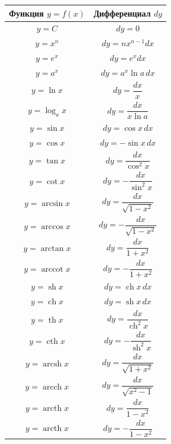 \documentclass[12pt]{article}
\begin{document}
\renewcommand{\arraystretch}{3}
\setlength{\tabcolsep}{70pt}
\begin{longtable}{|c|c|}
\hline
Функция $y = f(x)$ & Дифференциал $dy$ \\
\hline
$\displaystyle y = C$ & $\displaystyle dy = 0$ \\
\hline
$\displaystyle y = x^n$ & $\displaystyle dy = nx^{n-1}dx$ \\
\hline
$\displaystyle y = e^x$ & $\displaystyle dy = e^xdx$ \\
\hline
$\displaystyle y = a^x$ & $\displaystyle dy = a^x \ln{a} \, dx$ \\
\hline
$\displaystyle y = \ln{x}$ & $\displaystyle dy = \dfrac{dx}{x}$ \\
\hline
$\displaystyle y = \log_a{x}$ & $\displaystyle dy = \dfrac{dx}{x \ln{a}}$ \\
\hline
$\displaystyle y = \sin{x}$ & $\displaystyle dy = \cos{x} \, dx$ \\
\hline
$\displaystyle y = \cos{x}$ & $\displaystyle dy = - \sin{x} \, dx$ \\
\hline
$\displaystyle y = \tan{x}$ & $\displaystyle dy = \dfrac{dx}{\cos^2{x}}$ \\
\hline
$\displaystyle y = \cot{x}$ & $\displaystyle dy = - \dfrac{dx}{\sin^2{x}}$ \\
\hline
$\displaystyle y = \arcsin{x}$ & $\displaystyle dy = \dfrac{dx}{\sqrt{1 - x^2}}$ \\
\hline
$\displaystyle y = \arccos{x}$ & $\displaystyle dy = - \dfrac{dx}{\sqrt{1 - x^2}}$ \\
\hline
$\displaystyle y = \arctan{x}$ & $\displaystyle dy = \dfrac{dx}{1 + x^2}$ \\
\hline
$\displaystyle y = \operatorname{arccot}{x}$ & $\displaystyle dy = - \dfrac{dx}{1 + x^2}$ \\
\hline
$\displaystyle y = \operatorname{sh}{x}$ & $\displaystyle dy = \operatorname{ch}{x} \, dx$ \\
\hline
$\displaystyle y = \operatorname{ch}{x}$ & $\displaystyle dy = \operatorname{sh}{x} \, dx$ \\
\hline
$\displaystyle y = \operatorname{th}{x}$ & $\displaystyle dy = \dfrac{dx}{\operatorname{ch}^2{x}}$ \\
\hline
$\displaystyle y = \operatorname{cth}{x}$ & $\displaystyle dy = - \dfrac{dx}{\operatorname{sh}^2{x}}$ \\
\hline
$\displaystyle y = \operatorname{arcsh}{x}$ & $\displaystyle dy = \dfrac{dx}{\sqrt{1 + x^2}}$ \\
\hline
$\displaystyle y = \operatorname{arcch}{x}$ & $\displaystyle dy = \dfrac{dx}{\sqrt{x^2 - 1}}$ \\
\hline
$\displaystyle y = \operatorname{arcth}{x}$ & $\displaystyle dy = \dfrac{dx}{1 - x^2}$ \\
\hline
$\displaystyle y = \operatorname{arcth}{x}$ & $\displaystyle dy = - \dfrac{dx}{1 - x^2}$ \\
\hline
\end{longtable}
\end{document}
